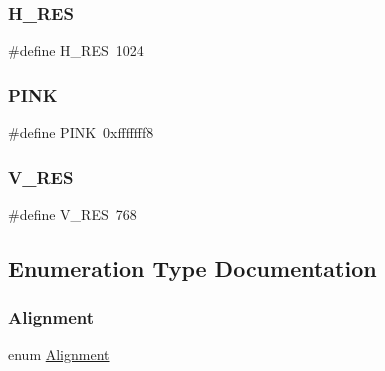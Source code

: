 \subsubsection{\texorpdfstring{H\+\_\+\+R\+ES}{H\_RES}}
{\footnotesize\ttfamily \#define H\+\_\+\+R\+ES~1024}

\mbox{\label{group___bitmap_gada419fe3b48fcf19daed7cc57ccf1174}} 
\subsubsection{\texorpdfstring{P\+I\+NK}{PINK}}
{\footnotesize\ttfamily \#define P\+I\+NK~0xfffffff8}

\mbox{\label{group___bitmap_gaac2466862bcfc18231c38fe1eacc22e3}} 
\subsubsection{\texorpdfstring{V\+\_\+\+R\+ES}{V\_RES}}
{\footnotesize\ttfamily \#define V\+\_\+\+R\+ES~768}



\subsection{Enumeration Type Documentation}
\mbox{\label{group___bitmap_gacdfaca60ec19c0265bac2692d7982726}} 
\subsubsection{\texorpdfstring{Alignment}{Alignment}}
{\footnotesize\ttfamily enum \hyperlink{group___bitmap_gacdfaca60ec19c0265bac2692d7982726}{Alignment}}

